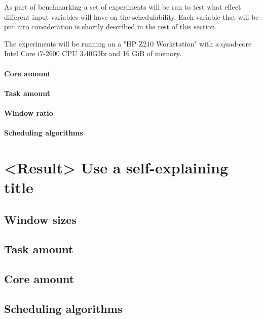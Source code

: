 \documentclass{kththesis}
\begin{document}
As part of benchmarking a set of experiments will be ran to test what effect different input
variables will have on the schedulability. Each variable that will be put into consideration is
shortly described in the rest of this section.

The experiments will be running on a "HP Z210 Workstation" with a quad-core Intel Core i7-2600 CPU
\@3.40GHz and 16 GiB of memory.


\subsubsection{Core amount}

\subsubsection{Task amount}

\subsubsection{Window ratio}

\subsubsection{Scheduling algorithms}

\chapter{<Result> Use a self-explaining title}

\section{Window sizes}

\section{Task amount}

\section{Core amount}

\section{Scheduling algorithms}
\end{document}
